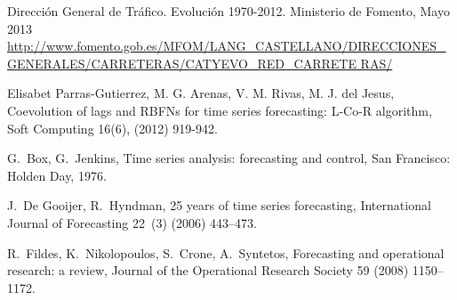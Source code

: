 \documentclass[runningheads]{llncs}
\begin{document}


\begin{thebibliography}{x}

Dirección General de Tráfico. Evolución 1970-2012. Ministerio de Fomento, Mayo 2013
\url{
http://www.fomento.gob.es/MFOM/LANG_CASTELLANO/DIRECCIONES_GENERALES/CARRETERAS/CATYEVO_RED_CARRETE
RAS/}

Elisabet Parras-Gutierrez, M. G. Arenas, V. M. Rivas,  M. J. del Jesus, Coevolution of lags and RBFNs for time
series forecasting: L-Co-R algorithm, Soft Computing 16(6), (2012) 919-942.

G.~Box, G.~Jenkins, Time series analysis: forecasting and control, San
  Francisco: Holden Day, 1976.

J.~{De Gooijer}, R.~Hyndman, 25 years of time series forecasting, International
  Journal of Forecasting 22~(3) (2006) 443--473.

R.~Fildes, K.~Nikolopoulos, S.~Crone, A.~Syntetos, Forecasting and operational
  research: a review, Journal of the Operational Research Society 59 (2008)
  1150--1172.









\end{thebibliography}
\end{document}
